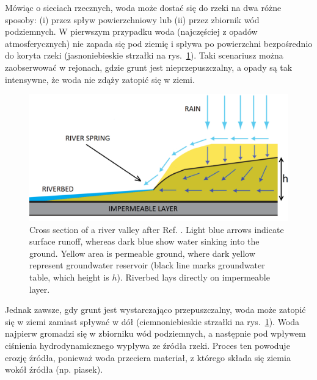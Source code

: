 \documentclass[]{pracamgr}
\begin{document}
    Mówiąc o sieciach rzecznych, woda może dostać się do rzeki na dwa różne sposoby: (i) przez spływ powierzchniowy lub (ii) przez zbiornik wód podziemnych. W pierwszym przypadku woda (najczęściej z opadów atmosferycznych) nie zapada się pod ziemię i spływa po powierzchni bezpośrednio do koryta rzeki (jasnoniebieskie strzałki na rys.~\ref{pow_wsiakanie}). Taki scenariusz można zaobserwować w rejonach, gdzie grunt jest nieprzepuszczalny, a opady są tak intensywne, że woda nie zdąży zatopić się w ziemi.

    \begin{figure}[H]
      \centering
      \includegraphics[width=1\textwidth]{figs/pow_wsiakanie_eng.png}
      \caption { Cross section of a river valley after Ref. \cite{berhanu2012shape}. Light blue arrows indicate surface runoff, whereas dark blue show water sinking into the ground. Yellow area is permeable ground, where dark yellow represent groundwater reservoir (black line marks groundwater table, which height is $h$). Riverbed lays directly on impermeable layer.}
      \label{pow_wsiakanie}
    \end{figure}

    Jednak zawsze, gdy grunt jest wystarczająco przepuszczalny, woda może zatopić się w ziemi zamiast spływać w dół (ciemnoniebieskie strzałki na rys.~\ref{pow_wsiakanie}). Woda najpierw gromadzi się w zbiorniku wód podziemnych, a następnie pod wpływem ciśnienia hydrodynamicznego wypływa ze źródła rzeki. Proces ten powoduje erozję źródła, ponieważ woda przeciera materiał, z którego składa się ziemia wokół źródła (np. piasek).
\end{document}
